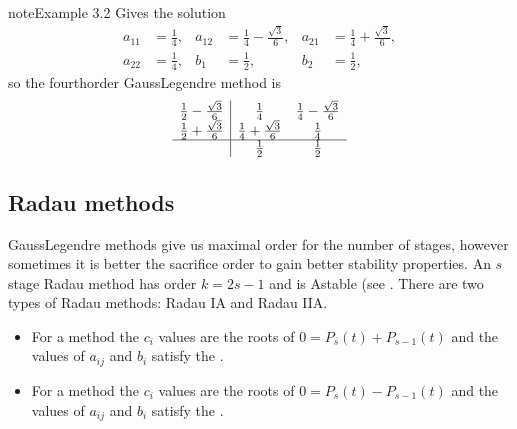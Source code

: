 \documentclass[letterpaper,10pt,english]{jupyterBook}
\begin{document}
\begin{sphinxadmonition}{note}{Example 3.2}
\sphinxAtStartPar
Gives the solution
\begin{align*}
    a_{11} &= \frac{1}{4}, &
    a_{12} &= \frac{1}{4} - \frac{\sqrt{3}}{6}, &
    a_{21} &= \frac{1}{4} + \frac{\sqrt{3}}{6}, \\
    a_{22} &= \frac{1}{4}, &
    b_1 &= \frac{1}{2}, &
    b_2 &= \frac{1}{2},
\end{align*}
\sphinxAtStartPar
so the fourth\sphinxhyphen{}order Gauss\sphinxhyphen{}Legendre method is
\begin{align*}
    \begin{array}{c|cc}
        \frac{1}{2} - \frac{\sqrt{3}}{6} & \frac{1}{4} & \frac{1}{4} - \frac{\sqrt{3}}{6} \\
        \frac{1}{2} + \frac{\sqrt{3}}{6} & \frac{1}{4} + \frac{\sqrt{3}}{6} & \frac{1}{4} \\ \hline
        & \frac{1}{2} & \frac{1}{2}
    \end{array}
\end{align*}\end{sphinxadmonition}


\subsection{Radau methods}
\label{\detokenize{3_IRKs/3.1_Deriving_IRK_methods:radau-methods}}\label{\detokenize{3_IRKs/3.1_Deriving_IRK_methods:radau-derivation}}
\sphinxAtStartPar
Gauss\sphinxhyphen{}Legendre methods give us maximal order for the number of stages, however sometimes it is better the sacrifice order to gain better stability properties. An \(s\)\sphinxhyphen{}stage Radau method has order \(k=2s-1\) and is A\sphinxhyphen{}stable (see {\hyperref[\detokenize{4_Stability/4.3_IRK_stability_function:a-stability-definition}]{}}. There are two types of Radau methods: Radau IA and Radau IIA.
\begin{itemize}
\item {} 
\sphinxAtStartPar
For a  method the \(c_i\) values are the roots of \(0 = P_s(t) + P_{s-1}(t)\) and the values of \(a_{ij}\) and \(b_i\) satisfy the {\hyperref[\detokenize{3_IRKs/3.0_IRKs:bk-ck-dk-order-conditions}]{}}.

\item {} 
\sphinxAtStartPar
For a  method the \(c_i\) values are the roots of \(0 = P_s(t) - P_{s-1}(t)\) and the values of \(a_{ij}\) and \(b_i\) satisfy the {\hyperref[\detokenize{3_IRKs/3.0_IRKs:bk-ck-dk-order-conditions}]{}}.

\end{itemize}
\end{document}
